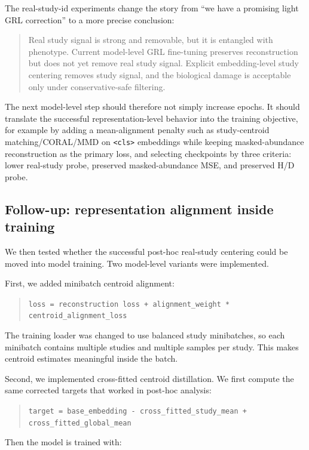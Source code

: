 \documentclass[11pt]{article}
\newcommand{\code}[1]{\texttt{\small #1}}
\begin{document}
The real-study-id experiments change the story from ``we have a promising light GRL
correction'' to a more precise conclusion:

\begin{quote}
Real study signal is strong and removable, but it is entangled with phenotype. Current
model-level GRL fine-tuning preserves reconstruction but does not yet remove real study
signal. Explicit embedding-level study centering removes study signal, and the biological
damage is acceptable only under conservative-safe filtering.
\end{quote}

The next model-level step should therefore not simply increase epochs. It should translate
the successful representation-level behavior into the training objective, for example by
adding a mean-alignment penalty such as study-centroid matching/CORAL/MMD on
\code{<cls>} embeddings while keeping masked-abundance reconstruction as the primary
loss, and selecting checkpoints by three criteria: lower real-study probe, preserved
masked-abundance MSE, and preserved H/D probe.

\subsection{Follow-up: representation alignment inside training}

We then tested whether the successful post-hoc real-study centering could be moved into
model training. Two model-level variants were implemented.

First, we added minibatch centroid alignment:

\begin{quote}
\code{loss = reconstruction loss + alignment\_weight * centroid\_alignment\_loss}
\end{quote}

The training loader was changed to use balanced study minibatches, so each minibatch
contains multiple studies and multiple samples per study. This makes centroid estimates
meaningful inside the batch.

Second, we implemented cross-fitted centroid distillation. We first compute the same
corrected targets that worked in post-hoc analysis:

\begin{quote}
\code{target = base\_embedding - cross\_fitted\_study\_mean + cross\_fitted\_global\_mean}
\end{quote}

Then the model is trained with:
\end{document}
